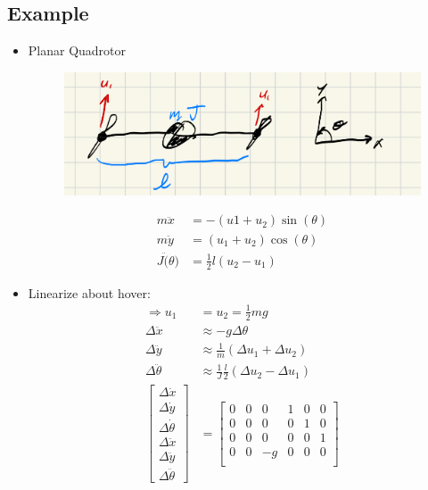 \documentclass[11pt]{article}
\begin{document}
\subsection{Example}
\begin{itemize}
    \item Planar Quadrotor
    \begin{figure}[H]
        \centering
        \includegraphics[width=0.6\linewidth]{l10_3.png}
    \end{figure}
    \begin{align*}
        m\ddot{x} &= -(u1 + u_2)\sin(\theta)
        \\
        m\ddot{y} &= (u_1 + u_2)\cos(\theta)
        \\
        J\ddot(\theta) &= \frac{1}{2}l(u_2-u_1)
    \end{align*}
    \item Linearize about hover:
    \begin{align*}
        \Rightarrow u_1&=u_2 = \frac{1}{2}mg
        \\
        \Delta\ddot{x} &\approx -g\Delta\theta
        \\
        \Delta\ddot{y} &\approx \frac{1}{m}(\Delta u_1 + \Delta u_2) \\
        \Delta\ddot{\theta} &\approx\frac{1}{J}\frac{l}{2}(\Delta u_2 - \Delta u_1)
        \\
        \begin{bmatrix}
            \Delta \dot{x} \\
            \Delta \dot{y} \\
            \Delta \dot{\theta}\\
            \Delta \ddot{x} \\
            \Delta \ddot{y} \\
            \Delta \ddot{\theta}
        \end{bmatrix}
        &= 
        \begin{bmatrix}
            0 & 0 & 0 & 1 & 0 & 0 \\
            0 & 0 & 0 & 0 & 1 & 0 \\
            0 & 0 & 0 & 0 & 0 & 1 \\
            0 & 0 & -g & 0 & 0 & 0 \\

\end{bmatrix}
\end{align*}
\end{itemize}
\end{document}
